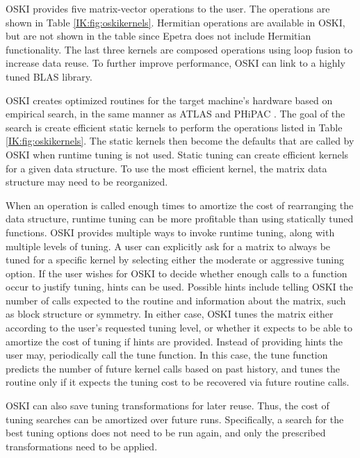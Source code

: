OSKI provides five matrix-vector operations to the user.  The operations are
shown in Table \ref{IK:fig:oskikernels}.  Hermitian operations are available in OSKI,
but are not shown in the table since Epetra does not include Hermitian functionality.  The last three
kernels are composed operations using loop fusion \cite{IK:loopfussion} to increase data reuse.
To further improve performance, OSKI can link to a highly tuned BLAS library.

OSKI creates optimized routines for the target machine's hardware
based on empirical search, in the same manner as ATLAS \cite{IK:ATLAS} and PHiPAC \cite{IK:PHiPAC}.  The goal of the
search is create efficient static kernels to perform the operations listed in Table \ref{IK:fig:oskikernels}.
The static kernels then become the defaults that are called by OSKI when runtime
tuning is not used.  Static tuning can create efficient kernels for a
given data structure.
To use the most efficient kernel, the matrix data structure may need to be reorganized.

When an operation is called enough times to amortize the cost of rearranging the
data structure, runtime tuning can be more profitable than using statically tuned
functions.  OSKI provides multiple ways to invoke runtime tuning, along with multiple
levels of tuning.  A user can explicitly ask for a matrix to always be tuned for a specific
kernel by selecting either the moderate or aggressive tuning option.  If the user wishes for OSKI to
decide whether enough calls to a function occur to justify tuning, hints can be used.
Possible hints include telling OSKI the number of calls expected to the routine and information
about the matrix, such as block structure or symmetry.  In either
case, OSKI tunes the matrix either according to the
user's requested tuning level, or whether it expects to be able to
amortize the cost of tuning if hints are provided.  Instead of providing hints the user may,
periodically call the tune function.  In this case, the tune function predicts
the number of future kernel calls based on past history, and tunes the routine only
if it expects the tuning cost to be recovered via future routine calls.

OSKI can also save tuning transformations for later reuse.  Thus, the cost of tuning searches can be
amortized over future runs.  Specifically, a search for the best tuning options does not need to be
run again, and only the prescribed transformations need to be applied.

